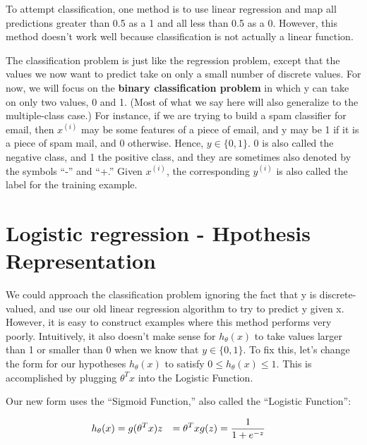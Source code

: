 \documentclass[
]{book}
\begin{document}
To attempt classification, one method is to use linear regression and map all predictions greater than 0.5 as a 1 and all less than 0.5 as a 0. However, this method doesn't work well because classification is not actually a linear function.

The classification problem is just like the regression problem, except that the values we now want to predict take on only a small number of discrete values. For now, we will focus on the \textbf{binary classification problem} in which y can take on only two values, 0 and 1. (Most of what we say here will also generalize to the multiple-class case.) For instance, if we are trying to build a spam classifier for email, then \(x^{(i)}\) may be some features of a piece of email, and y may be 1 if it is a piece of spam mail, and 0 otherwise. Hence, \(y∈{\{0,1\}}\). 0 is also called the negative class, and 1 the positive class, and they are sometimes also denoted by the symbols ``-'' and ``+.'' Given \(x^{(i)}\), the corresponding \(y^{(i)}\) is also called the label for the training example.

\hypertarget{logistic-regression---hpothesis-representation}{%
\section{Logistic regression - Hpothesis Representation}\label{logistic-regression---hpothesis-representation}}

We could approach the classification problem ignoring the fact that y is discrete-valued, and use our old linear regression algorithm to try to predict y given x. However, it is easy to construct examples where this method performs very poorly. Intuitively, it also doesn't make sense for \(h_\theta (x)\) to take values larger than 1 or smaller than 0 when we know that \(y ∈ {\{0, 1\}}\). To fix this, let's change the form for our hypotheses \(h_\theta (x)\) to satisfy \(0 \leq h_\theta (x) \leq 1\). This is accomplished by plugging \(\theta^Tx\) into the Logistic Function.

Our new form uses the ``Sigmoid Function,'' also called the ``Logistic Function'':

\begin{align} h_\theta (x) &= g ( \theta^T x ) \newline \newline z &= \theta^T x \newline g(z) &= \dfrac{1}{1 + e^{-z}}\end{align}
\end{document}
